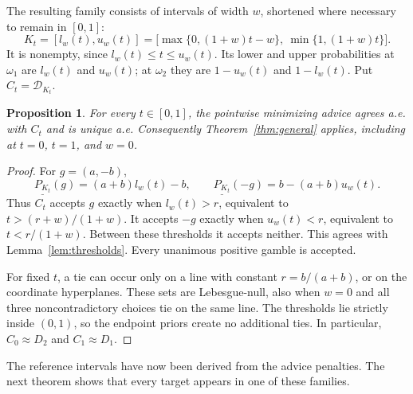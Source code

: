 \documentclass[11pt]{article}
\newtheorem{proposition}[theorem]{Proposition}
\theoremstyle{remark}
\newcommand{\Dscr}{\mathcal D}
\newcommand{\lpr}[1]{\underline{P_{#1}}}
\begin{document}
The resulting family consists of intervals of width $w$, shortened where
necessary to remain in $[0,1]$:
\begin{equation}
 \boxed{\quad
 K_t=[l_w(t),u_w(t)]
 =\bigl[\max\{0,(1+w)t-w\},\ \min\{1,(1+w)t\}\bigr].
 \quad}\label{eq:interval-family}
\end{equation}
It is nonempty, since $l_w(t)\le t\le u_w(t)$.
Its lower and upper probabilities at $\omega_1$ are $l_w(t)$ and $u_w(t)$;
at $\omega_2$ they are $1-u_w(t)$ and $1-l_w(t)$.
Put $C_t=\Dscr_{K_t}$.

\begin{proposition}\label{prop:bayes-interval}
For every $t\in[0,1]$, the pointwise minimizing advice agrees a.e. with $C_t$
and is unique a.e. Consequently Theorem~\ref{thm:general} applies, including
at $t=0$, $t=1$, and $w=0$.
\end{proposition}
\begin{proof}
For $g=(a,-b)$,
\[
 \lpr{K_t}(g)=(a+b)l_w(t)-b,\qquad
 \lpr{K_t}(-g)=b-(a+b)u_w(t).
\]
Thus $C_t$ accepts $g$ exactly when $l_w(t)>r$, equivalent to
$t>(r+w)/(1+w)$. It accepts $-g$ exactly when $u_w(t)<r$, equivalent to
$t<r/(1+w)$. Between these thresholds it accepts neither. This agrees with
Lemma~\ref{lem:thresholds}. Every unanimous positive gamble is accepted.

For fixed $t$, a tie can occur only on a line with constant
$r=b/(a+b)$, or on the coordinate hyperplanes. These sets are Lebesgue-null,
also when $w=0$ and all three noncontradictory choices tie on the same line.
The thresholds lie strictly inside $(0,1)$, so the endpoint priors create no
additional ties. In particular, $C_0\approx D_2$ and $C_1\approx D_1$.
\end{proof}

The reference intervals have now been derived from the advice penalties.
The next theorem shows that every target appears in one of these families.
\end{document}

